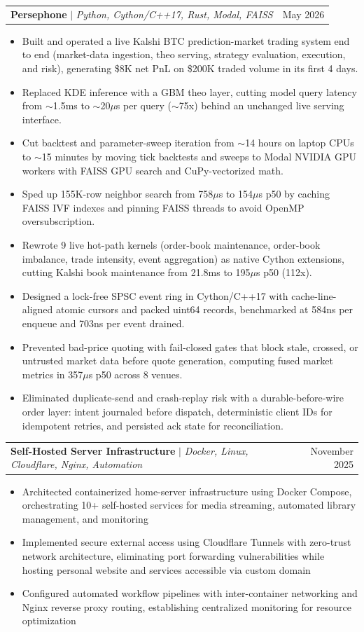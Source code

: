 \documentclass[letterpaper,11pt]{article}
\makeatletter
\newcommand{\resumeItem}[1]{
  \item\small{
    {#1 \vspace{-2pt}}
  }
}
\newcommand{\resumeProjectHeading}[2]{
    \item
    \begin{tabular*}{0.97\textwidth}{l@{\extracolsep{\fill}}r}
      \small#1 & #2 \\
    \end{tabular*}\vspace{-7pt}
}
\newcommand{\resumeItemListStart}{\begin{itemize}}
\newcommand{\resumeItemListEnd}{\end{itemize}\vspace{-5pt}}
\makeatother
\begin{document}
    \resumeProjectHeading
      {\textbf{Persephone} $|$ \emph{Python, Cython/C++17, Rust, Modal, FAISS}}{May 2026}
      \resumeItemListStart
        \resumeItem{Built and operated a live Kalshi BTC prediction-market trading system end to end (market-data ingestion, theo serving, strategy evaluation, execution, and risk), generating \$8K net PnL on \$200K traded volume in its first 4 days.}
        \resumeItem{Replaced KDE inference with a GBM theo layer, cutting model query latency from $\sim$1.5ms to $\sim$20$\mu$s per query ($\sim$75x) behind an unchanged live serving interface.}
        \resumeItem{Cut backtest and parameter-sweep iteration from $\sim$14 hours on laptop CPUs to $\sim$15 minutes by moving tick backtests and sweeps to Modal NVIDIA GPU workers with FAISS GPU search and CuPy-vectorized math.}
        \resumeItem{Sped up 155K-row neighbor search from 758$\mu$s to 154$\mu$s p50 by caching FAISS IVF indexes and pinning FAISS threads to avoid OpenMP oversubscription.}
        \resumeItem{Rewrote 9 live hot-path kernels (order-book maintenance, order-book imbalance, trade intensity, event aggregation) as native Cython extensions, cutting Kalshi book maintenance from 21.8ms to 195$\mu$s p50 (112x).}
        \resumeItem{Designed a lock-free SPSC event ring in Cython/C++17 with cache-line-aligned atomic cursors and packed uint64 records, benchmarked at 584ns per enqueue and 703ns per event drained.}
        \resumeItem{Prevented bad-price quoting with fail-closed gates that block stale, crossed, or untrusted market data before quote generation, computing fused market metrics in 357$\mu$s p50 across 8 venues.}
        \resumeItem{Eliminated duplicate-send and crash-replay risk with a durable-before-wire order layer: intent journaled before dispatch, deterministic client IDs for idempotent retries, and persisted ack state for reconciliation.}
      \resumeItemListEnd

    \resumeProjectHeading
      {\textbf{Self-Hosted Server Infrastructure} $|$ \emph{Docker, Linux, Cloudflare, Nginx, Automation}}{November 2025}
      \resumeItemListStart
        \resumeItem{Architected containerized home-server infrastructure using Docker Compose, orchestrating 10+ self-hosted services for media streaming, automated library management, and monitoring}
        \resumeItem{Implemented secure external access using Cloudflare Tunnels with zero-trust network architecture, eliminating port forwarding vulnerabilities while hosting personal website and services accessible via custom domain}
        \resumeItem{Configured automated workflow pipelines with inter-container networking and Nginx reverse proxy routing, establishing centralized monitoring for resource optimization}
      \resumeItemListEnd
\end{document}
